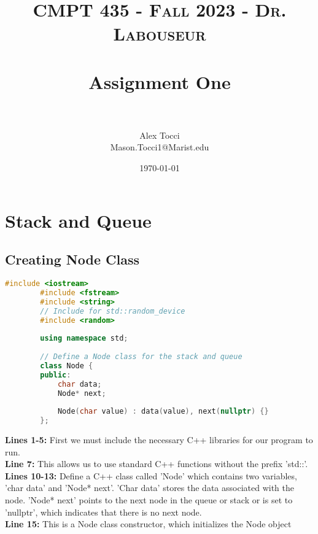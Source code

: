 \documentclass[letterpaper, 10pt,DIV=13]{scrartcl}
\title{	
   \normalfont \normalsize 
   \textsc{CMPT 435 - Fall 2023 - Dr. Labouseur} \\[10pt] %
   \horrule{0.5pt} \\[0.25cm] 	%
   \huge Assignment One  \\     	    %
   \horrule{0.5pt} \\[0.25cm] 	%
}
\author{Alex Tocci \\ \normalsize Mason.Tocci1@Marist.edu}
\date{\normalsize\today} 	%
\numberwithin{equation}{section} %
\numberwithin{figure}{section} %
\numberwithin{table}{section} %
\begin{document}
\maketitle %

\section{Stack and Queue}

\subsection{Creating Node Class}
\begin{linenumbers}
\begin{lstlisting}[language=C++, caption={Node Class}, label={code:example}]
        #include <iostream>
        #include <fstream>
        #include <string>
        // Include for std::random_device
        #include <random>
        
        using namespace std;
        
        // Define a Node class for the stack and queue
        class Node {
        public:
            char data;
            Node* next;
        
            Node(char value) : data(value), next(nullptr) {}
        };
\end{lstlisting}
\end{linenumbers}
\nolinenumbers

\textbf{Lines 1-5:} First we must include the necessary C++ libraries for our program to run. \\
\textbf{Line 7:} This allows us to use standard C++ functions without the prefix 'std::'. \\
\textbf{Lines 10-13:} Define a C++ class called 'Node' which contains two variables, 'char data' and 'Node* next'. 'Char data' stores the data associated with the node. 'Node* next' points to the next node in the queue or stack or is set to 'nullptr', which indicates that there is no next node. \\
\textbf{Line 15:} This is a Node class constructor, which initializes the Node object
\end{document}
